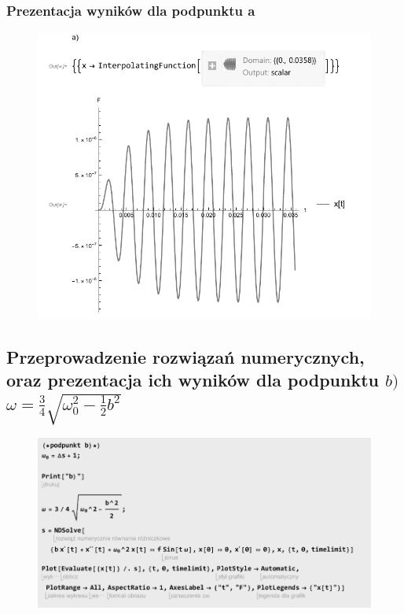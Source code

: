 \documentclass[polish,polish,a4paper]{article}
\begin{document}
		\subsubsection*{Prezentacja wyników dla podpunktu a}
		
						\begin{figure}[H]
			\centering
			\includegraphics[scale=0.9]{wyk1}
		\end{figure}
		
		\subsection{Przeprowadzenie rozwiązań numerycznych, oraz prezentacja ich wyników dla podpunktu $ b) $ $\omega = \frac{3}{4}\sqrt{\omega_{0}^2 - \frac{1}{2}b^2}$}
		
				\begin{figure}[H]
	\centering
	\includegraphics[scale=1]{zad1b}
\end{figure}
		
\end{document}
